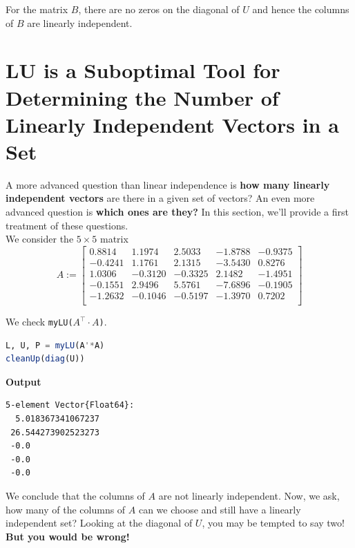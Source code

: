 For the matrix $B$, there are no zeros on the diagonal of $U$ and hence the columns of $B$ are linearly independent.\\

\section{LU is a Suboptimal Tool for Determining the Number of Linearly Independent Vectors in a Set}

A more advanced question than linear independence is \textbf{how many linearly independent vectors} are there in a given set of vectors? An even more advanced question is \textbf{which ones are they?} In this section, we'll provide a first treatment of these questions. \\

We consider the $5 \times 5$ matrix 
\begin{equation}
A:= \left[
\begin{array}{rrrrr}
0.8814 & 1.1974 & 2.5033 & -1.8788 & -0.9375 \\
-0.4241 & 1.1761 & 2.1315 & -3.5430 & 0.8276 \\
1.0306 & -0.3120 & -0.3325 & 2.1482 & -1.4951 \\
-0.1551 & 2.9496 & 5.5761 & -7.6896 & -0.1905 \\
-1.2632 & -0.1046 & -0.5197 & -1.3970 & 0.7202 \\
\end{array}
\right]
\end{equation}

We check \texttt{myLU($A^\top \cdot A$)}.\\


\begin{lstlisting}[language=Julia,style=mystyle]
L, U, P = myLU(A'*A)
cleanUp(diag(U))
\end{lstlisting}
\textbf{Output} 
\begin{verbatim}
5-element Vector{Float64}:
  5.018367341067237
 26.544273902523273
 -0.0
 -0.0
 -0.0
\end{verbatim}

We conclude that the columns of $A$ are not linearly independent. Now, we ask, how many of the columns of $A$ can we choose and still have a linearly independent set? Looking at the diagonal of $U$, you may be tempted to say two! \textbf{But you would be wrong!}


